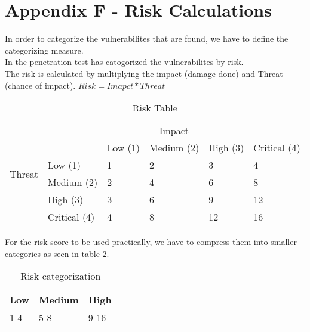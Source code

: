 \section{Appendix F - Risk Calculations}

In order to categorize the vulnerabilites that are found, we have to define the categorizing measure. \\
In the penetration test has catogorized the vulnerabilites by risk. \\
The risk is calculated by multiplying the impact (damage done) and Threat (chance of impact). \(Risk = Imapct * Threat\) \\
\begin{table}[h]
\centering
\begin{tabular}{llllll}
\multirow{6}{*}{Threat} & \multicolumn{5}{c}{Impact}                                                                                                                                             \\ \cline{3-6} 
                        & \multicolumn{1}{l|}{}             & \multicolumn{1}{l|}{Low (1)} & \multicolumn{1}{l|}{Medium (2)} & \multicolumn{1}{l|}{High (3)} & \multicolumn{1}{l|}{Critical (4)} \\ \cline{2-6} 
                        & \multicolumn{1}{l|}{Low (1)}      & \multicolumn{1}{l|}{1}       & \multicolumn{1}{l|}{2}          & \multicolumn{1}{l|}{3}        & \multicolumn{1}{l|}{4}            \\ \cline{2-6} 
                        & \multicolumn{1}{l|}{Medium (2)}   & \multicolumn{1}{l|}{2}       & \multicolumn{1}{l|}{4}          & \multicolumn{1}{l|}{6}        & \multicolumn{1}{l|}{8}            \\ \cline{2-6} 
                        & \multicolumn{1}{l|}{High (3)}     & \multicolumn{1}{l|}{3}       & \multicolumn{1}{l|}{6}          & \multicolumn{1}{l|}{9}        & \multicolumn{1}{l|}{12}           \\ \cline{2-6} 
                        & \multicolumn{1}{l|}{Critical (4)} & \multicolumn{1}{l|}{4}       & \multicolumn{1}{l|}{8}          & \multicolumn{1}{l|}{12}       & \multicolumn{1}{l|}{16}           \\ \cline{2-6} 
\end{tabular}
\caption{Risk Table}
\label{my-label}
\end{table}

For the risk score to be used practically, we have to compress them into smaller categories as seen in table 2.

\begin{table}[h]
\centering
\begin{tabular}{|l|l|l|}
\hline
Low & Medium & High \\ \hline
1-4 & 5-8    & 9-16 \\ \hline
\end{tabular}
\caption{Risk categorization}
\label{my-label}
\end{table}
